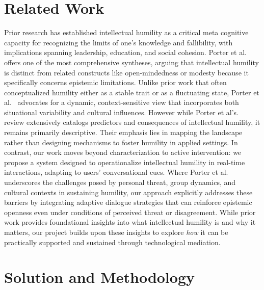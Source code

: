 \documentclass{scrartcl}
\begin{document}

\section{Related Work}
\label{section:related-work}
Prior research has established intellectual humility as a critical meta cognitive capacity for recognizing the limits of one’s knowledge and fallibility, with implications spanning leadership, education, and social cohesion. Porter et al.~\cite{porter2022} offers one of the most comprehensive syntheses, arguing that intellectual humility is distinct from related constructs like open-mindedness or modesty because it specifically concerns epistemic limitations. Unlike prior work that often conceptualized humility either as a stable trait or as a fluctuating state, Porter et al.~\cite{porter2022} advocates for a dynamic, context-sensitive view that incorporates both situational variability and cultural influences.
However while Porter et al's.~\cite{porter2022} review extensively catalogs predictors and consequences of intellectual humility, it remains primarily descriptive. Their emphasis lies in mapping the landscape rather than designing mechanisms to foster humility in applied settings. In contrast, our work moves beyond characterization to active intervention: we propose a system designed to operationalize intellectual humility in real-time interactions, adapting to users' conversational cues. Where Porter et al. underscores the challenges posed by personal threat, group dynamics, and cultural contexts in sustaining humility, our approach explicitly addresses these barriers by integrating adaptive dialogue strategies that can reinforce epistemic openness even under conditions of perceived threat or disagreement.
While prior work provides foundational insights into what intellectual humility is and why it matters, our project builds upon these insights to explore \emph{how} it can be practically supported and sustained through technological mediation.



\section{Solution and Methodology}
\label{section:solution-methodology}
\end{document}
